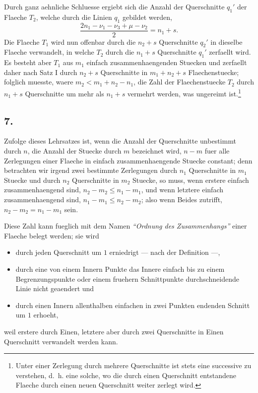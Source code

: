 \documentclass[12pt,a4paper]{book}
\theoremstyle{definition}
\theoremstyle{remark}
\begin{document}
Durch ganz aehnliche Schluesse ergiebt sich die Anzahl der Querschnitte $q_1'$ der Flaeche $T_2$, welche durch die Linien $q_1$ gebildet werden,
\[
\frac{2n_1 - \nu_1 - \nu_3 + \mu - \nu_2}{2} = n_1 + s.
\]
Die Flaeche $T_1$ wird nun offenbar durch die $n_2 + s$ Querschnitte $q_2'$ in dieselbe Flaeche verwandelt, in welche $T_2$ durch die $n_1 + s$ Querschnitte $q_1'$ zerfaellt wird. Es besteht aber $T_1$ aus $m_1$ einfach zusammenhaengenden Stuecken und zerfaellt daher nach Satz I durch $n_2 + s$ Querschnitte in $m_1 + n_2 + s$ Flaechenstuecke; folglich muesste, waere $m_2 < m_1 + n_2 - n_1$, die Zahl der Flaechenstuecke $T_2$ durch $n_1 + s$ Querschnitte um mehr als $n_1 + s$ vermehrt werden, was ungereimt ist.\footnote{Unter einer Zerlegung durch mehrere Querschnitte ist stets eine successive zu verstehen, d.\ h. eine solche, wo die durch einen Querschnitt entstandene Flaeche durch einen neuen Querschnitt weiter zerlegt wird.}

\subsection*{7.}

Zufolge dieses Lehrsatzes ist, wenn die Anzahl der Querschnitte unbestimmt durch $n$, die Anzahl der Stuecke durch $m$ bezeichnet wird, $n - m$ fuer alle Zerlegungen einer Flaeche in einfach zusammenhaengende Stuecke constant; denn betrachten wir irgend zwei bestimmte Zerlegungen durch $n_1$ Querschnitte in $m_1$ Stuecke und durch $n_2$ Querschnitte in $m_2$ Stuecke, so muss, wenn erstere einfach zusammenhaengend sind, $n_2 - m_2 \leq n_1 - m_1$, und wenn letztere einfach zusammenhaengend sind, $n_1 - m_1 \leq n_2 - m_2$; also wenn Beides zutrifft, $n_2 - m_2 = n_1 - m_1$ sein.

Diese Zahl kann fueglich mit dem Namen \emph{``Ordnung des Zusammenhangs''} einer Flaeche belegt werden; sie wird
\begin{itemize}[nosep]
\item durch jeden Querschnitt um $1$ erniedrigt --- nach der Definition ---,
\item durch eine von einem Innern Punkte das Innere einfach bis zu einem Begrenzungspunkte oder einem fruehern Schnittpunkte durchschneidende Linie nicht geaendert und
\item durch einen Innern allenthalben einfachen in zwei Punkten endenden Schnitt um $1$ erhoeht,
\end{itemize}
weil erstere durch Einen, letztere aber durch zwei Querschnitte in Einen Querschnitt verwandelt werden kann.
\end{document}
